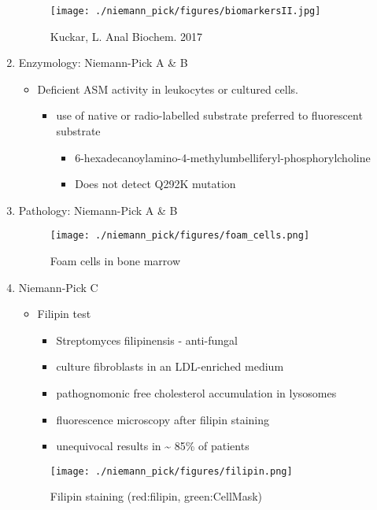 \documentclass{scrartcl}
\begin{document}
\begin{enumerate}
\begin{figure}[htbp]
\centering
\texttt{[image: ./niemann\_pick/figures/biomarkersII.jpg]}
\caption{\label{fig:orge94fb49}
Kuckar, L. Anal Biochem. 2017}
\end{figure}

\item Enzymology: Niemann-Pick A \& B
\label{sec:org36ed260}

\begin{itemize}
\item Deficient ASM activity in leukocytes or cultured cells.
\begin{itemize}
\item use of native or radio-labelled substrate preferred to fluorescent substrate
\begin{itemize}
\item 6-hexadecanoylamino-4-methylumbelliferyl-phosphorylcholine
\item Does not detect Q292K mutation
\end{itemize}
\end{itemize}
\end{itemize}

\item Pathology: Niemann-Pick A \& B
\label{sec:org987f4c3}

\begin{figure}[htbp]
\centering
\texttt{[image: ./niemann\_pick/figures/foam\_cells.png]}
\caption{\label{fig:org9658109}
Foam cells in bone marrow}
\end{figure}

\item Niemann-Pick C
\label{sec:org0952190}
\begin{itemize}
\item Filipin test
\begin{itemize}
\item Streptomyces filipinensis - anti-fungal
\item culture fibroblasts in an LDL-enriched medium
\item pathognomonic free cholesterol accumulation in lysosomes
\item fluorescence microscopy after filipin staining
\item unequivocal results in \textasciitilde{} 85\% of patients
\end{itemize}
\end{itemize}

\begin{figure}[htbp]
\centering
\texttt{[image: ./niemann\_pick/figures/filipin.png]}
\caption{\label{fig:org5a4464f}
Filipin staining (red:filipin, green:CellMask)}
\end{figure}
\end{enumerate}
\end{document}
